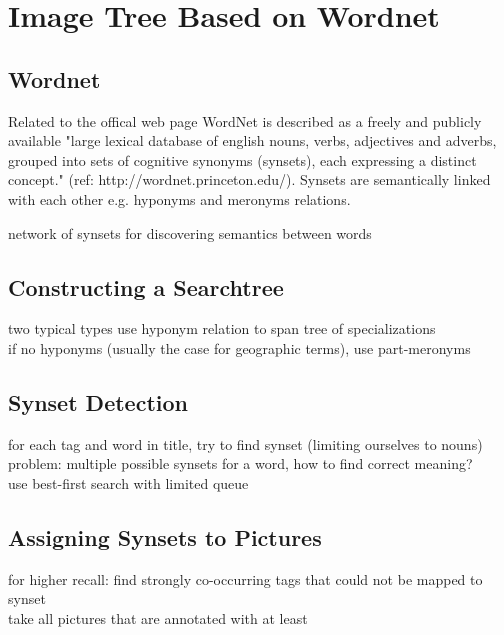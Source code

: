 %
\section{Image Tree Based on Wordnet}
\label{sec_wordnetsearchtree}

\subsection{Wordnet}
Related to the offical web page WordNet is described as a freely and publicly available "large lexical database of english nouns, verbs, adjectives and adverbs, grouped into sets of cognitive synonyms (synsets), each expressing a distinct concept." (ref: http://wordnet.princeton.edu/). Synsets are semantically linked with each other e.g. hyponyms and meronyms relations. 

network of synsets for discovering semantics between words \\
  

\subsection{Constructing a Searchtree}
two typical types 
use hyponym relation to span tree of specializations \\
if no hyponyms (usually the case for geographic terms), use part-meronyms \\

\subsection{Synset Detection}
for each tag and word in title, try to find synset (limiting ourselves to nouns) \\
problem: multiple possible synsets for a word, how to find correct meaning? \\
use best-first search with limited queue

\subsection{Assigning Synsets to Pictures}
for higher recall: find strongly co-occurring tags that could not be mapped to synset \\
take all pictures that are annotated with at least 